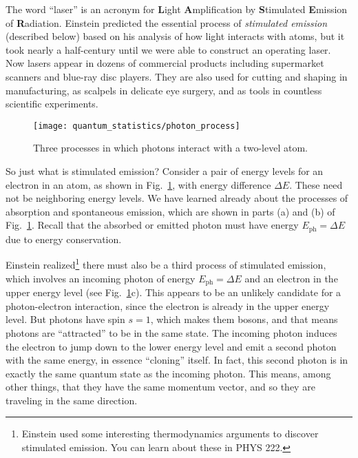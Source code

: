 The word ``laser'' is an acronym for \textbf{L}ight
\textbf{A}mplification by \textbf{S}timulated \textbf{E}mission of
\textbf{R}adiation.  Einstein predicted the essential process of
\textit{stimulated emission} (described below) based on his analysis
of how light interacts with atoms, but it took nearly a half-century
until we were able to construct an operating laser. Now lasers appear
in dozens of commercial products including supermarket scanners and
blue-ray disc players. They are also used for cutting and shaping in
manufacturing, as scalpels in delicate eye surgery, and as tools in
countless scientific experiments.

\begin{figure}[t]
\begin{center}
\texttt{[image: quantum\_statistics/photon\_process]}
\caption{Three processes in which photons interact with a two-level
  atom.}
\label{fig:photon_process}
\end{center}
\end{figure}

So just what is stimulated emission?  Consider a pair of energy levels
for an electron in an atom, as shown in Fig.~\ref{fig:photon_process},
with energy difference $\Delta E$.  These need not be neighboring
energy levels.  We have learned already about the processes of
absorption and spontaneous emission, which are shown in parts (a) and
(b) of Fig.~\ref{fig:photon_process}.  Recall that the absorbed or
emitted photon must have energy $E_\text{ph}=\Delta E$ due to energy
conservation.  


Einstein realized\footnote{Einstein used some
  interesting thermodynamics arguments to discover stimulated
  emission.  You can learn about these in PHYS 222.}  there must also
be a third process of stimulated emission, which involves an incoming
photon of energy $E_\text{ph} = \Delta E$ and an electron in the upper
energy level (see Fig.~\ref{fig:photon_process}c).  This appears to be
an unlikely candidate for a photon-electron interaction, since the
electron is already in the upper energy level.  But photons have spin
$s=1$, which makes them bosons, and that means photons are
``attracted'' to be in the same state.  The incoming photon induces
the electron to jump down to the lower energy level and emit a second
photon with the same energy, in essence ``cloning'' itself.  In fact,
this second photon is in exactly the same quantum state as the
incoming photon.  This means, among other things, that they have the
same momentum vector, and so they are traveling in the same direction.


